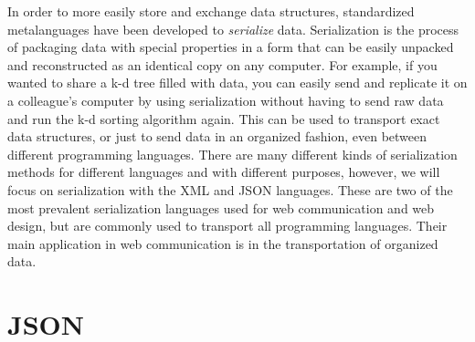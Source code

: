 \label{lab:webtech}

In order to more easily store and exchange data structures, standardized metalanguages have been developed to \emph{serialize} data.
Serialization is the process of packaging data with special properties in a form that can be easily unpacked and reconstructed as an identical copy on any computer.
For example, if you wanted to share a k-d tree filled with data, you can easily send and replicate it on a colleague's computer by using serialization without having to send raw data and run the k-d sorting algorithm again.
This can be used to transport exact data structures, or just to send data in an organized fashion, even between different programming languages.
There are many different kinds of serialization methods for different languages and with different purposes, however, we will focus on serialization with the XML and JSON languages.
These are two of the most prevalent serialization languages used for web communication and web design, but are commonly used to transport all programming languages.
Their main application in web communication is in the transportation of organized data.

\begin{comment}
In order for computers to communicate one with another, they need standardized ways of storing structured data.
For example, suppose you have a python list that you want to send to somebody else. How would you store it outside of the interpreter?
However we choose to store our list, we need to be able to load it back into the Python interpreter and use it as a list.
What if we wanted to store more complex objects?
The process of serialization seeks to address this situation.
Serialization is the process of storing an object and its properties in a form that can be saved or transmitted and later reconstructed back into an identical copy of the original object.
\end{comment}

\section*{JSON} %

